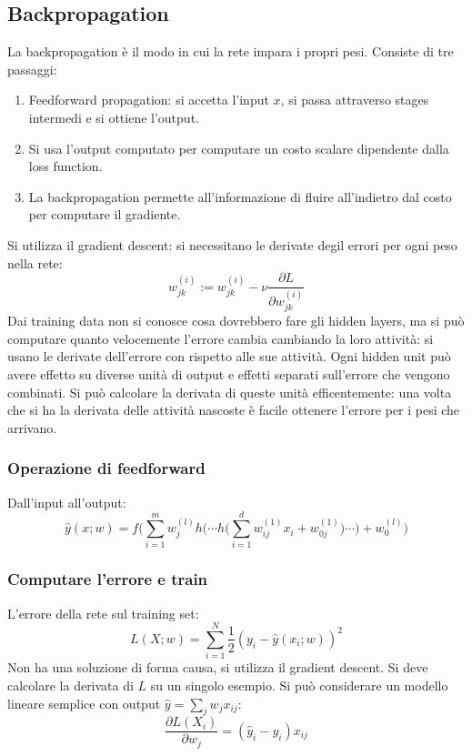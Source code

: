 	\subsection{Backpropagation}
	La backpropagation \`e il modo in cui la rete impara i propri pesi.
	Consiste di tre passaggi:
	\begin{multicols}{2}
		\begin{enumerate}
			\item Feedforward propagation: si accetta l'input $x$, si passa attraverso stages intermedi e si ottiene l'output.
			\item Si usa l'output computato per computare un costo scalare dipendente dalla loss function.
			\item La backpropagation permette all'informazione di fluire all'indietro dal costo per computare il gradiente.
		\end{enumerate}
	\end{multicols}
	Si utilizza il gradient descent: si necessitano le derivate degil errori per ogni peso nella rete:
	$$w^{(i)}_{jk} := w^{(i)}_{jk} - \nu\frac{\partial L}{\partial w^{(i)}_{jk}}$$
	Dai training data non si conosce cosa dovrebbero fare gli hidden layers, ma si pu\`o computare quanto velocemente l'errore cambia cambiando la loro attivit\`a: si usano le derivate dell'errore con rispetto alle sue attivit\`a.
	Ogni hidden unit pu\`o avere effetto su diverse unit\`a di output e effetti separati sull'errore che vengono combinati.
	Si pu\`o calcolare la derivata di queste unit\`a efficentemente: una volta che si ha la derivata delle attivit\`a nascoste \`e facile ottenere l'errore per i pesi che arrivano.

		\subsubsection{Operazione di feedforward}
		Dall'input all'output:
		$$\hat{y}(x;w) = f\bigl(\sum\limits_{i=1}^mw_j^{(l)}h\bigl(\cdots h\bigl(\sum\limits_{i = 1}^dw_{ij}^{(1)}x_i + w_{0j}^{(1)}\bigr)\cdots\bigr) + w_0^{(l)}\bigr)$$

		\subsubsection{Computare l'errore e train}
		L'errore della rete sul training set:
		$$L(X;w) = \sum\limits_{i=1}^N\frac{1}{2}(y_i-\hat{y}(x_i;w))^2$$
		Non ha una soluzione di forma causa, si utilizza il gradient descent.
		Si deve calcolare la derivata di $L$ su un singolo esempio.
		Si pu\`o considerare un modello lineare semplice con output $\hat{y} = \sum\limits_jw_jx_{ij}$:
		$$\frac{\partial L(X_i)}{\partial w_j} = (\hat{y}_i -y_i)x_{ij}$$

